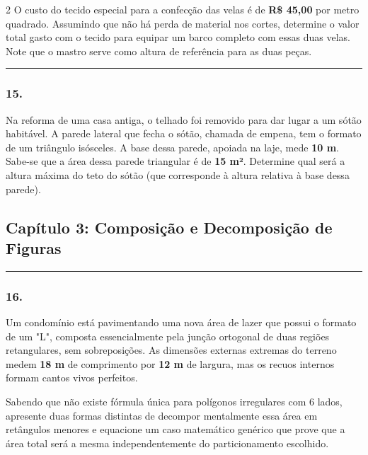 \documentclass[twoside, 10pt, a4paper]{article}
\newlength{\espacoPosTitulo}\setlength{\espacoPosTitulo}{0.3cm}
\newlength{\espacoPreQuestao}\setlength{\espacoPreQuestao}{0.1cm}
\newlength{\espacoQuestao}\setlength{\espacoQuestao}{0.2cm}
\begin{document}
\begin{multicols*}{2}
O custo do tecido especial para a confecção das velas é de \textbf{R\$ 45,00} por metro quadrado. Assumindo que não há perda de material nos cortes, determine o valor total gasto com o tecido para equipar um barco completo com essas duas velas. Note que o mastro serve como altura de referência para as duas peças.
\par\vspace{\espacoQuestao}

\noindent\textcolor{CorLinha}{\rule{\linewidth}{0.5pt}} 
\par\vspace{\espacoPreQuestao}
\subsubsection*{15.} Na reforma de uma casa antiga, o telhado foi removido para dar lugar a um sótão habitável. A parede lateral que fecha o sótão, chamada de empena, tem o formato de um triângulo isósceles. A base dessa parede, apoiada na laje, mede \textbf{10 m}. Sabe-se que a área dessa parede triangular é de \textbf{15 m²}. Determine qual será a altura máxima do teto do sótão (que corresponde à altura relativa à base dessa parede).
\par\vspace{\espacoQuestao}

\subsection*{Capítulo 3: Composição e Decomposição de Figuras}
\vspace{-0.2cm}\noindent\rule{\linewidth}{1.5pt} 
\par\vspace{\espacoPosTitulo}
\subsubsection*{16.} Um condomínio está pavimentando uma nova área de lazer que possui o formato de um "L", composta essencialmente pela junção ortogonal de duas regiões retangulares, sem sobreposições. As dimensões externas extremas do terreno medem \textbf{18 m} de comprimento por \textbf{12 m} de largura, mas os recuos internos formam cantos vivos perfeitos.
\par
Sabendo que não existe fórmula única para polígonos irregulares com 6 lados, apresente duas formas distintas de decompor mentalmente essa área em retângulos menores e equacione um caso matemático genérico que prove que a área total será a mesma independentemente do particionamento escolhido.
\par\vspace{\espacoQuestao}


\end{multicols*}
\end{document}

